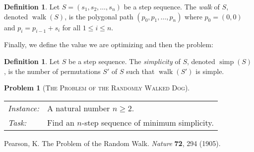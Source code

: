 \documentclass{amsart}
\DeclareMathOperator{\walk}{walk}
\DeclareMathOperator{\simp}{simp}
\theoremstyle{definition}
\newtheorem{definition}[proposition]{Definition}
\theoremstyle{problem}
\newtheorem{problem}[proposition]{Problem}
\theoremstyle{remark}
\begin{document}
\begin{definition}
    Let $S=(s_1,s_2,\dots,s_n)$ be a step sequence. The \emph{walk} of $S$, denoted
    $\walk(S)$, is the polygonal path $(p_0,p_1,\dots,p_n)$
    where $p_0=(0,0)$ and $p_i=p_{i-1}+s_i$ for all $1\le i\le n$.
\end{definition}

Finally, we define the value we are optimizing and then the problem:

\begin{definition}
    Let $S$ be a step sequence. The \emph{simplicity} of $S$,
    denoted $\simp(S)$, is the number of permutations $S'$ of $S$
    such that $\walk(S')$ is simple.
\end{definition}

\begin{problem}[\textsc{The Problem of the Randomly Walked Dog}]
\begin{framed}
    \begin{tabular}{@{}ll}
        \textit{Instance:} &
        A natural number $n\ge2$. \\

        \textit{Task:}     &
        Find an $n$-step sequence of minimum simplicity.
    \end{tabular}
    \vskip -2pt
\end{framed}
\end{problem}

\begin{thebibliography}{9}

    Pearson, K.
    The Problem of the Random Walk.
    \emph{Nature}
    \textbf{72},
    294 (1905).

\end{thebibliography}
\end{document}
